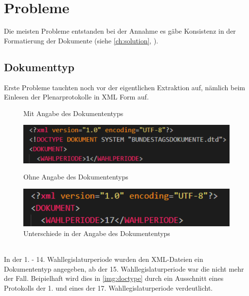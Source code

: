 \chapter{Probleme}
Die meisten Probleme entstanden bei der Annahme es gäbe Konsistenz in der Formatierung der Dokumente (siehe \autoref{ch:solution}, ). 
\section{Dokumenttyp}
Erste Probleme tauchten noch vor der eigentlichen Extraktion auf, nämlich beim Einlesen der Plenarprotokolle in XML Form auf.
\begin{figure}[h]
	\begin{minipage}{.48\linewidth}
		\caption*{Mit Angabe des Dokumententyps}
		\includegraphics[width=\linewidth]{img/withdoctype.pdf}		
	\end{minipage}\hfill
	\begin{minipage}{.48\linewidth}
		\caption*{Ohne Angabe des Dokumententyps}
		\includegraphics[width=\linewidth]{img/withoutdoctype.pdf}
	\end{minipage}
	\caption{Unterschiede in der Angabe des Dokumententyps}
	\label{img:doctype}
\end{figure}\\
In der 1. - 14. Wahllegislaturperiode wurden den XML-Dateien ein Dokumententyp angegeben, ab der 15. Wahllegislaturperiode war die nicht mehr der Fall. Beipielhaft wird dies in \autoref{img:doctype} durch ein Ausschnitt eines Protokolls der 1. und eines der 17. Wahllegislaturperiode verdeutlicht.

